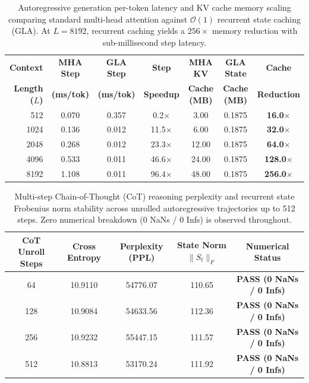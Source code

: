 \documentclass[journal]{IEEEtran}
\begin{document}
\begin{table}[t]
\centering
\caption{Autoregressive generation per-token latency and KV cache memory scaling comparing standard multi-head attention against $\mathcal{O}(1)$ recurrent state caching (GLA). At $L=8192$, recurrent caching yields a $256\times$ memory reduction with sub-millisecond step latency.}
\label{tab:autoregressive_kv_scaling}
\small
\begin{tabular}{rcccccc}
\toprule
\textbf{Context} & \textbf{MHA Step} & \textbf{GLA Step} & \textbf{Step} & \textbf{MHA KV} & \textbf{GLA State} & \textbf{Cache} \\
\textbf{Length ($L$)} & \textbf{(ms/tok)} & \textbf{(ms/tok)} & \textbf{Speedup} & \textbf{Cache (MB)} & \textbf{Cache (MB)} & \textbf{Reduction} \\
\midrule
512 & 0.070 & 0.357 & 0.2$\times$ & 3.00 & 0.1875 & \textbf{16.0}$\times$ \\
1024 & 0.136 & 0.012 & 11.5$\times$ & 6.00 & 0.1875 & \textbf{32.0}$\times$ \\
2048 & 0.268 & 0.012 & 23.3$\times$ & 12.00 & 0.1875 & \textbf{64.0}$\times$ \\
4096 & 0.533 & 0.011 & 46.6$\times$ & 24.00 & 0.1875 & \textbf{128.0}$\times$ \\
8192 & 1.108 & 0.011 & 96.4$\times$ & 48.00 & 0.1875 & \textbf{256.0}$\times$ \\
\bottomrule
\end{tabular}
\end{table}

\begin{table}[t]
\centering
\caption{Multi-step Chain-of-Thought (CoT) reasoning perplexity and recurrent state Frobenius norm stability across unrolled autoregressive trajectories up to 512 steps. Zero numerical breakdown (0 NaNs / 0 Infs) is observed throughout.}
\label{tab:cot_perplexity_stability}
\small
\begin{tabular}{ccccc}
\toprule
\textbf{CoT Unroll Steps} & \textbf{Cross Entropy} & \textbf{Perplexity (PPL)} & \textbf{State Norm $\|S_t\|_F$} & \textbf{Numerical Status} \\
\midrule
64 & 10.9110 & 54776.07 & 110.65 & \textbf{PASS (0 NaNs / 0 Infs)} \\
128 & 10.9084 & 54633.56 & 112.36 & \textbf{PASS (0 NaNs / 0 Infs)} \\
256 & 10.9232 & 55447.15 & 111.57 & \textbf{PASS (0 NaNs / 0 Infs)} \\
512 & 10.8813 & 53170.24 & 111.92 & \textbf{PASS (0 NaNs / 0 Infs)} \\
\bottomrule
\end{tabular}
\end{table}
\end{document}
